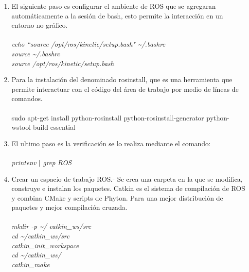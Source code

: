 \documentclass[12pt,a4paper]{article}
\begin{document}
\begin{enumerate}
\item El siguiente paso es configurar el ambiente de ROS que se agregaran automáticamente a la sesión de bash, esto permite la interacción en un entorno no gráfico.\\\\
\textit{echo ``source /opt/ros/kinetic/setup.bash" \guillemotright \textasciitilde{}/.bashrc}
\\ 
\textit{source \textasciitilde{}/.bashrc}
\\
\textit{source /opt/ros/kinetic/setup.bash}
\\
\item Para la instalación del denominado rosinstall, que es una herramienta que permite interactuar con el código del área de trabajo por medio de líneas de comandos.
\\\\
sudo apt-get install python-rosinstall python-rosinstall-generator python-wstool build-essential
\item El ultimo paso es la verificación se lo realiza mediante el comando:
\\\\
\textit{printenv $|$ grep ROS}
\item Crear un espacio de trabajo ROS.-
Se crea una carpeta en la que se modifica, construye e instalan los paquetes. Catkin es el sistema de compilación de ROS y combina CMake y scripts de Phyton. Para una mejor distribución de paquetes y mejor compilación cruzada.
\\\\
\textit{mkdir -p \textasciitilde / catkin\_ws/src}
\\
\textit{cd \textasciitilde /catkin\_ws/src}
\\
\textit{catkin\_init\_workspace}
\\
\textit{cd \textasciitilde/catkin\_ws/}
\\
\textit{catkin\_make}
\end{enumerate}
\end{document}
